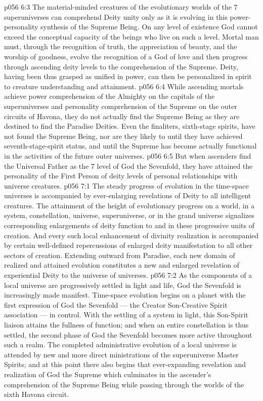 \vs p056 6:3 \pc The material\hyp{}minded creatures of the evolutionary worlds of the 7 superuniverses can comprehend Deity unity only as it is evolving in this power\hyp{}personality synthesis of the Supreme Being. On any level of existence God cannot exceed the conceptual capacity of the beings who live on such a level. Mortal man must, through the recognition of truth, the appreciation of beauty, and the worship of goodness, evolve the recognition of a God of love and then progress through ascending deity levels to the comprehension of the Supreme. Deity, having been thus grasped as unified in power, can then be personalized in spirit to creature understanding and attainment.
\vs p056 6:4 While ascending mortals achieve power comprehension of the Almighty on the capitals of the superuniverses and personality comprehension of the Supreme on the outer circuits of Havona, they do not actually find the Supreme Being as they are destined to find the Paradise Deities. Even the finaliters, sixth\hyp{}stage spirits, have not found the Supreme Being, nor are they likely to until they have achieved seventh\hyp{}stage\hyp{}spirit status, and until the Supreme has become actually functional in the activities of the future outer universes.
\vs p056 6:5 But when ascenders find the Universal Father as the 7 level of God the Sevenfold, they have attained the personality of the First Person of  deity levels of personal relationships with universe creatures.
\vs p056 7:1 The steady progress of evolution in the time\hyp{}space universes is accompanied by ever\hyp{}enlarging revelations of Deity to all intelligent creatures. The attainment of the height of evolutionary progress on a world, in a system, constellation, universe, superuniverse, or in the grand universe signalizes corresponding enlargements of deity function to and in these progressive units of creation. And every such local enhancement of divinity realization is accompanied by certain well\hyp{}defined repercussions of enlarged deity manifestation to all other sectors of creation. Extending outward from Paradise, each new domain of realized and attained evolution constitutes a new and enlarged revelation of experiential Deity to the universe of universes.
\vs p056 7:2 As the components of a local universe are progressively settled in light and life, God the Sevenfold is increasingly made manifest. Time\hyp{}space evolution begins on a planet with the first expression of God the Sevenfold --- the Creator Son\hyp{}Creative Spirit association --- in control. With the settling of a system in light, this Son\hyp{}Spirit liaison attains the fullness of function; and when an entire constellation is thus settled, the second phase of God the Sevenfold becomes more active throughout such a realm. The completed administrative evolution of a local universe is attended by new and more direct ministrations of the superuniverse Master Spirits; and at this point there also begins that ever\hyp{}expanding revelation and realization of God the Supreme which culminates in the ascender’s comprehension of the Supreme Being while passing through the worlds of the sixth Havona circuit.
